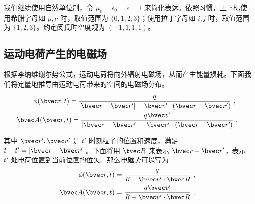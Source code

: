 

我们继续使用自然单位制，令 $\mu_0=\epsilon_0=c=1$ 来简化表达。依照习惯，上下标使用希腊字母如 $\mu, \nu$ 时，取值范围为 $\{0, 1, 2, 3\}$；使用拉丁字母如 $i, j$ 时，取值范围为 $\{1, 2, 3\}$。约定闵氏时空度规为 $(-1,1,1,1)$。
\subsection{运动电荷产生的电磁场}
根据李纳维谢尔势公式，运动电荷将向外辐射电磁场，从而产生能量损耗。下面我们将定量地推导由运动电荷带来的空间的电磁场分布。

\begin{equation}
\begin{aligned}
\phi(\bvec r,t)=\frac{q}{|\bvec r-\bvec r'|-\bvec v'\cdot (\bvec r-\bvec r')}~,~\\
\bvec A(\bvec r,t)=\frac{q\bvec v'}{|\bvec r-\bvec r'|-\bvec v'\cdot (\bvec r-\bvec r')}~.
\end{aligned}
\end{equation}

其中 $\bvec r',\bvec v'$ 是 $t'$ 时刻粒子的位置和速度，满足 $t-t'=|\bvec r-\bvec r'|$。下面将用 $\bvec R$ 来表示 $\bvec r-\bvec r'$，表示 $t'$ 处电荷位置到当前位置的位矢。那么电磁势可以写为
\begin{equation}
\begin{aligned}
\phi(\bvec r,t)=\frac{q}{R-\bvec v'\cdot \bvec R}~,\\
\bvec A(\bvec r,t)=\frac{q\bvec v'}{R-\bvec v'\cdot \bvec R}~.
\end{aligned}
\end{equation}

